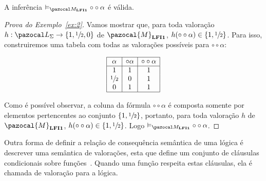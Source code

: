         \begin{exemplo}\label{ex:2}
            A inferência $ \conmat \circ \circ \alpha$ é válida.
        \end{exemplo}

        \begin{proof}[Prova do Exemplo~\ref{ex:2}]
            Vamos mostrar que, para toda valoração $h : \ling{} \to \{1,\meio{},0\}$ de $\pazocal{M}_{\lfium{}}$, $h(\circ \circ \alpha) \in \{1, \sfrac{1}{2}{}\}$. Para isso, construiremos uma tabela com todas as valorações possíveis para $\circ \circ \alpha$:
            \begin{center}
                \[
                    \begin{array}{|c|c|c|}%
                        \hline
                        \alpha      & \circ \alpha & \circ \circ \alpha   \\
                        \hline%
                        1           & 1            &    1\\
                        \meio{    } & 0            &    1\\
                        0           & 1            &    1\\
                        \hline
                    \end{array}
                \]
            \end{center}

            Como é possível observar, a coluna da fórmula $\circ \circ \alpha$ é composta somente por elementos pertencentes ao conjunto $\{1, \sfrac{1}{2}{}\}$, portanto, para toda valoração $h$ de $\pazocal{M}_{\lfium{}}$, $h(\circ \circ \alpha) \in \{1, \sfrac{1}{2}{}\}$. Logo $ \conmat \circ \circ \alpha$.
            
        \end{proof}

        
        Outra forma de definir a relação de consequência semântica de uma lógica é descrever uma semântica de valorações, esta que define um conjunto de cláusulas condicionais sobre funções~\cite{DaCosta1977-NEWASA-3}. Quando uma função respeita estas cláusulas, ela é chamada de valoração para a lógica.

